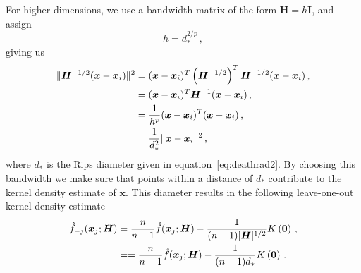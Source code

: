 \documentclass[letter,12pt]{article}
\newcommand{\argmax}{\mathop{\text{argmax}}}
\begin{document}

For higher dimensions, we use a bandwidth matrix of the form $\bm{H} = h\bm{I}$, and assign
\begin{equation}\label{eq:bandwidth}
    h = d_*^{2/p} \, , 
\end{equation}
giving us 
\begin{align}\label{eq:kde11}
    \| \bm{H}^{-1/2}(\bm{x} - \bm{x}_i) \|^2  & = (\bm{x} - \bm{x}_i)^T \left(\bm{H}^{-1/2}\right)^T \bm{H}^{-1/2} (\bm{x} - \bm{x}_i) \, , \notag \\
     & = (\bm{x} - \bm{x}_i)^T \bm{H}^{-1} (\bm{x} - \bm{x}_i) \, , \notag  \\
     & = \frac{1}{h^p}(\bm{x} - \bm{x}_i)^T  (\bm{x} - \bm{x}_i)\, , \notag \\
     & = \frac{1}{d_*^2}\|\bm{x} - \bm{x}_i \|^2 \, , 
\end{align}
where $d_*$ is the Rips diameter given in equation~\eqref{eq:deathrad2}. By choosing this bandwidth we make sure that points within a distance of $d_*$ contribute to the kernel density estimate of $\bm{x}$. This diameter results in the following leave-one-out kernel density estimate 
\begin{align}\label{eq:kde12}
    \hat{f}_{-j}(\bm{x}_j;\bm{H})  & = \frac{n}{n-1} \hat{f}(\bm{x}_j;\bm{H}) - \frac{1}{(n-1)|\bm{H}|^{1/2}} K\left(\bm{0}\right) \, ,  \notag \\
    & = = \frac{n}{n-1} \hat{f}(\bm{x}_j;\bm{H}) - \frac{1}{(n-1)d_*} K\left(\bm{0}\right) \,  .
\end{align}
\end{document}
